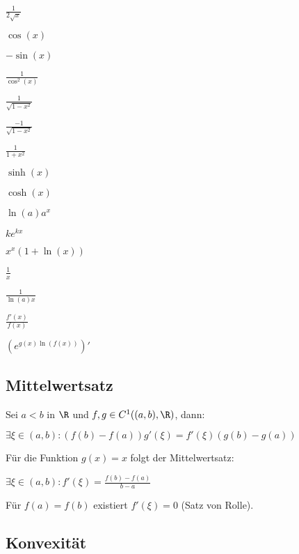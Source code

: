 \vspace*{-4mm}
\begin{multicols}{2}
\begin{description}[leftmargin=!,labelwidth=14mm]
	\item[$\sqrt{x}$]    $\frac{1}{2\sqrt{x}}$
	\item[$\sin(x)$]     $\cos(x)$
	\item[$\cos(x)$]     $-\sin(x)$
	\item[$\tan(x)$]     $\frac{1}{\cos^2(x)}$
	\item[$\arcsin(x)$]  $\frac{1}{\sqrt{1-x^2}}$
	\item[$\arccos(x)$]  $\frac{-1}{\sqrt{1-x^2}}$
	\item[$\arctan(x)$]  $\frac{1}{1+x^2}$
	\item[$\cosh(x)$]    $\sinh(x)$
	\item[$\sinh(x)$]    $\cosh(x)$
	\item[$a^x$]         $\ln(a) a^x$
	\item[$e^{kx}$]      $ke^{kx}$
	\item[$x^x$]         $x^x(1+\ln(x))$
	\item[$\ln(x)$]      $\frac{1}{x}$
	\item[$\log_a(x)$]   $\frac{1}{\ln(a) x}$
	\item[$\ln(f(x))$]   $\frac{f'(x)}{f(x)}$
	\item[$f(x)^{g(x)}$] $(e^{g(x)\ln(f(x))})'$
\end{description}
\end{multicols}
\vspace*{-4mm}

\subsection*{Mittelwertsatz}

Sei $a < b$ in $\R$ und $f, g \in C^1((a, b),\R)$, dann:

$\exists \xi \in (a, b) : ( f(b) - f(a) ) g'(\xi) = f'(\xi)(g(b) - g(a))$

Für die Funktion $g(x)=x$ folgt der Mittelwertsatz:

$\exists \xi \in (a, b) : f'(\xi) = \frac{f(b) - f(a)}{b - a}$

Für $f(a)=f(b)$ existiert $f'(\xi)=0$ (Satz von Rolle).

\subsection*{Konvexität}

